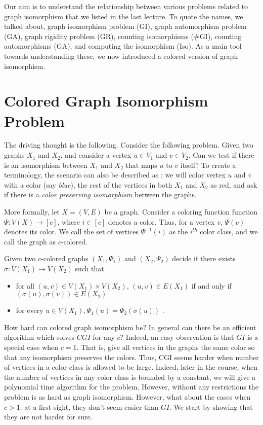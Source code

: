 
Our aim is to understand the relationship between various problems related to graph isomorphism that we listed in the last lecture. To quote the names, we talked about, graph isomorphism problem ({\sc GI}), graph automorphism problem ({\sc GA}), graph rigidity problem ({\sc GR}), counting isomorphisms ({\sc \#GI}), counting automorphisms ({\sc GA}), and computing the isomorphism ({\sc Iso}). As a main tool towards understanding these, we now introduced a colored version of graph isomorphism.

\section{Colored Graph Isomorphism Problem}

The driving thought is the following. Consider the following problem. Given two graphs $X_1$ and $X_2$, and consider a vertex $u \in V_1$ and $v \in V_2$. Can we test if there is an isomorphism between $X_1$ and $X_2$ that maps $u$ to $v$ itself? To create a terminology, the scenario can also be described as : we will color vertex $u$ and $v$ with a color (say {\em blue}), the rest of the vertices in both $X_1$ and $X_2$ as red, and ask if there is a {\em color preserving isomorphism} between the graphs.

More formally, let $X=(V,E)$ be a graph. Consider a coloring function function $\Psi : V(X) \rightarrow [c]$, where $i \in [c]$ denotes a color. Thus, for a vertex $v$, $\Psi(v)$ denotes its color. We call the set of vertices $\Psi^{-1}(i)$ as the $i^{th}$ color class, and we call the graph as $c$-colored.

\begin{problem}
Given two $c$-colored graphs $(X_1,\Psi_1)$ and $(X_2,\Psi_2)$ decide if there exists $\sigma : V(X_1) \rightarrow V(X_2)$ such that 
\begin{itemize}
\item for all $(u,v) \in V(X_1)\times V(X_2)$,  $(u,v) \in E(X_1)$ if and only if $(\sigma(u), \sigma(v)) \in E(X_2)$
\item for every $u \in V(X_1),\Psi_1(u) = \Psi_2(\sigma(u))$ .
\end{itemize}
\end{problem}

How hard can colored graph isomorphism be? In general can there be an efficient algorithm which solves $CGI$ for any $c$? Indeed, an easy observation is that $GI$ is a special case when $c=1$. That is, give all vertices in the graphs the same color so that any isomorphism preserves the colors. Thus, CGI seems harder when number of vertices in a color class is allowed to be large. Indeed, later in the course, when the number of vertices in any color class is bounded by a constant, we will give a polynomial time algorithm for the problem. However, without any restrictions the problem is as hard as graph isomorphism. However, what about the cases when $c>1$. at a first sight, they don't seem easier than $GI$. We start by showing that they are not harder for sure.

